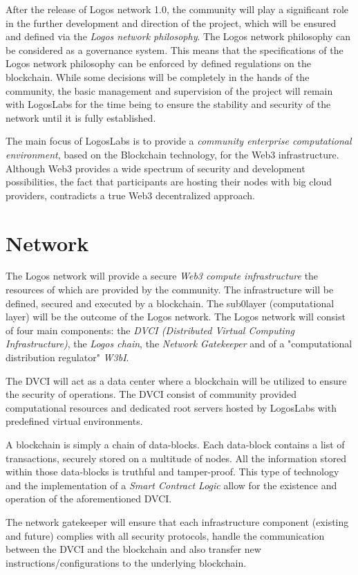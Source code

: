 \documentclass[]{article}
\begin{document}
After the release of Logos network 1.0, the community will play a significant role in the further development and direction of the project, which will be ensured and defined via the \textit{Logos network philosophy}.
The Logos network philosophy can be considered as a governance system.
This means that the specifications of the Logos network philosophy can be enforced by defined regulations on the blockchain.
While some decisions will be completely in the hands of the community, the basic management and supervision of the project will remain with LogosLabs for the time being to ensure the stability and security of the network until it is fully established.

The main focus of LogosLabs is to provide a \textit{community enterprise computational environment}, based on the Blockchain technology, for the Web3 infrastructure.
Although Web3 provides a wide spectrum of security and development possibilities, the fact that participants are hosting their nodes with big cloud providers, contradicts a true Web3 decentralized approach.

\section{Network}
The Logos network will provide a secure \textit{Web3 compute infrastructure} the resources of which are provided by the community.
The infrastructure will be defined, secured and executed by a blockchain.
The sub0layer (computational layer) will be the outcome of the Logos network.
The Logos network will consist of four main components: the \textit{DVCI (Distributed Virtual Computing Infrastructure)}, the \textit{Logos chain}, the \textit{Network Gatekeeper} and of a "computational distribution regulator" \textit{W3bI}. 

The DVCI will act as a data center where a blockchain will be utilized to ensure the security of operations.
The DVCI consist of community provided computational resources and dedicated root servers hosted by LogosLabs with predefined virtual environments.

A blockchain is simply a chain of data-blocks.
Each data-block contains a list of transactions, securely stored on a multitude of nodes. 
All the information stored within those data-blocks is truthful and tamper-proof.
This type of technology and the implementation of a \textit{Smart Contract Logic} allow for the existence and operation of the aforementioned DVCI.

The network gatekeeper will ensure that each infrastructure component (existing and future) complies with all security protocols, handle the communication between the DVCI and the blockchain and also transfer new instructions/configurations to the underlying blockchain.
\end{document}
